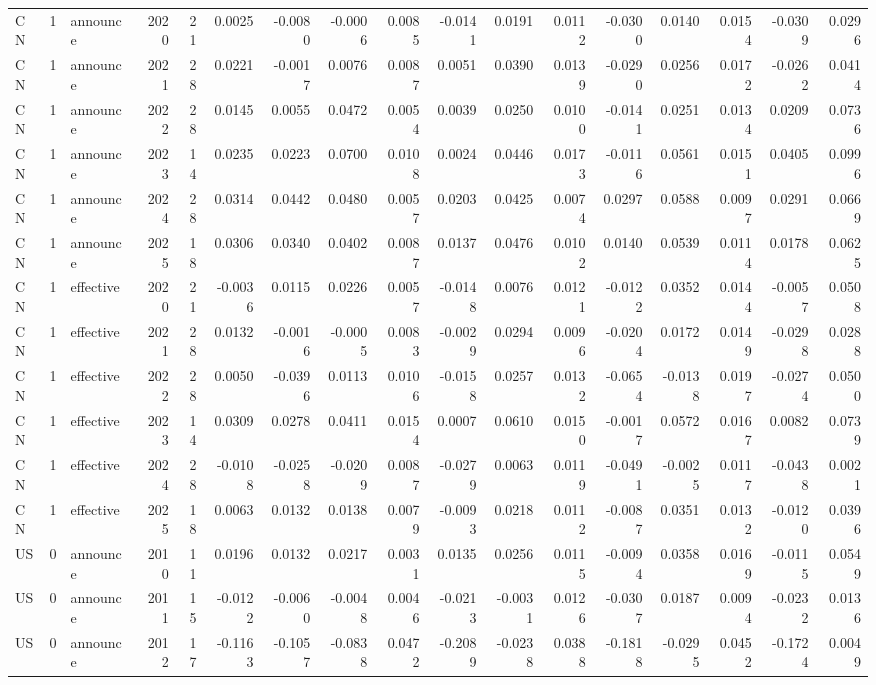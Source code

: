 \begin{tabular}{lrlrrrrrrrrrrrrrr}
CN & 1 & announce & 2020 & 21 & 0.0025 & -0.0080 & -0.0006 & 0.0085 & -0.0141 & 0.0191 & 0.0112 & -0.0300 & 0.0140 & 0.0154 & -0.0309 & 0.0296 \\
CN & 1 & announce & 2021 & 28 & 0.0221 & -0.0017 & 0.0076 & 0.0087 & 0.0051 & 0.0390 & 0.0139 & -0.0290 & 0.0256 & 0.0172 & -0.0262 & 0.0414 \\
CN & 1 & announce & 2022 & 28 & 0.0145 & 0.0055 & 0.0472 & 0.0054 & 0.0039 & 0.0250 & 0.0100 & -0.0141 & 0.0251 & 0.0134 & 0.0209 & 0.0736 \\
CN & 1 & announce & 2023 & 14 & 0.0235 & 0.0223 & 0.0700 & 0.0108 & 0.0024 & 0.0446 & 0.0173 & -0.0116 & 0.0561 & 0.0151 & 0.0405 & 0.0996 \\
CN & 1 & announce & 2024 & 28 & 0.0314 & 0.0442 & 0.0480 & 0.0057 & 0.0203 & 0.0425 & 0.0074 & 0.0297 & 0.0588 & 0.0097 & 0.0291 & 0.0669 \\
CN & 1 & announce & 2025 & 18 & 0.0306 & 0.0340 & 0.0402 & 0.0087 & 0.0137 & 0.0476 & 0.0102 & 0.0140 & 0.0539 & 0.0114 & 0.0178 & 0.0625 \\
CN & 1 & effective & 2020 & 21 & -0.0036 & 0.0115 & 0.0226 & 0.0057 & -0.0148 & 0.0076 & 0.0121 & -0.0122 & 0.0352 & 0.0144 & -0.0057 & 0.0508 \\
CN & 1 & effective & 2021 & 28 & 0.0132 & -0.0016 & -0.0005 & 0.0083 & -0.0029 & 0.0294 & 0.0096 & -0.0204 & 0.0172 & 0.0149 & -0.0298 & 0.0288 \\
CN & 1 & effective & 2022 & 28 & 0.0050 & -0.0396 & 0.0113 & 0.0106 & -0.0158 & 0.0257 & 0.0132 & -0.0654 & -0.0138 & 0.0197 & -0.0274 & 0.0500 \\
CN & 1 & effective & 2023 & 14 & 0.0309 & 0.0278 & 0.0411 & 0.0154 & 0.0007 & 0.0610 & 0.0150 & -0.0017 & 0.0572 & 0.0167 & 0.0082 & 0.0739 \\
CN & 1 & effective & 2024 & 28 & -0.0108 & -0.0258 & -0.0209 & 0.0087 & -0.0279 & 0.0063 & 0.0119 & -0.0491 & -0.0025 & 0.0117 & -0.0438 & 0.0021 \\
CN & 1 & effective & 2025 & 18 & 0.0063 & 0.0132 & 0.0138 & 0.0079 & -0.0093 & 0.0218 & 0.0112 & -0.0087 & 0.0351 & 0.0132 & -0.0120 & 0.0396 \\
US & 0 & announce & 2010 & 11 & 0.0196 & 0.0132 & 0.0217 & 0.0031 & 0.0135 & 0.0256 & 0.0115 & -0.0094 & 0.0358 & 0.0169 & -0.0115 & 0.0549 \\
US & 0 & announce & 2011 & 15 & -0.0122 & -0.0060 & -0.0048 & 0.0046 & -0.0213 & -0.0031 & 0.0126 & -0.0307 & 0.0187 & 0.0094 & -0.0232 & 0.0136 \\
US & 0 & announce & 2012 & 17 & -0.1163 & -0.1057 & -0.0838 & 0.0472 & -0.2089 & -0.0238 & 0.0388 & -0.1818 & -0.0295 & 0.0452 & -0.1724 & 0.0049 \\

\end{tabular}
